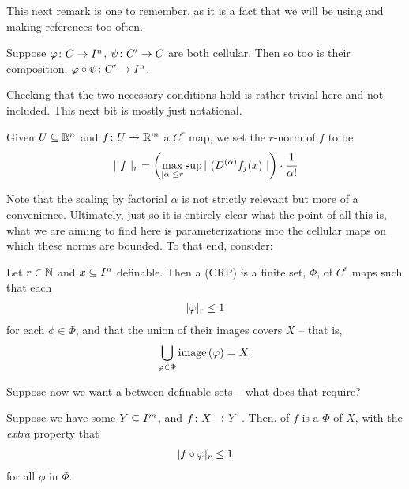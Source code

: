 This next remark is one to remember, as it is a fact that we will be using and making references too often.


\begin{remark}
  Suppose $\funcdom{\phi}{C}{I^n}$, $\funcdom{\psi}{\pri{C}}{C}$ are both cellular. Then so too is their composition, $\funcdom{\phi \circ \psi}{\pri{C}}{I^n}$.
\end{remark}
Checking that the two necessary conditions hold is rather trivial here and not included. This next bit is mostly just notational.

\begin{definition}
  Given $\XRn[U]{n}$ and $\funcdom{f}{U}{\R^m}$ a $C^r$ map, we set the $r$-norm of $f$ to be
    \begin{align*}
      \rnorm[r]{\ f \ } = \left( \max_{\abs{\alpha} \leq r}{ \sup{ \abs{ \ ( D^{(\alpha)} f_j(x) \ } } } \right) \cdot \cfrac{1}{\alpha !}
    \end{align*}
\end{definition}

Note that the scaling by factorial $\alpha$ is not strictly relevant but more of a convenience. Ultimately, just so it is entirely clear what the point of all this is, what we are aiming to find here is parameterizations into the cellular maps on which these norms are bounded. To that end, consider:

\begin{definition}
  Let $r \in \N$ and $\CIn[x]{n}$ definable. Then a \emph{\cellrparam} (CRP) is a finite set, $\Phi$, of  $C^r$ \cellr maps such that each
    \begin{align*}
      \rnorm[r]{\phi} \leq 1
    \end{align*}
  for each $\phi \in \Phi$, and that the union of their images covers $X$ -- that is,
    \begin{align*}
      \bigcup_{\phi \in \Phi} \image{\phi} = X.
    \end{align*}
\end{definition}
Suppose now we want a \cellrparam between definable sets -- what does that require?
\begin{definition}
  Suppose we have some $\CIn[Y]{m}$, and $\funcdom{f}{X}{Y}$ . Then. \cellrparam[r] of $f$ is a \cellrparam[r] $\Phi$ of $X$, with the \emph{extra} property that
    \begin{align*}
      \rnorm[r]{f \circ \phi} \leq 1
    \end{align*}
    for all $\phi$ in $\Phi$.
\end{definition}

